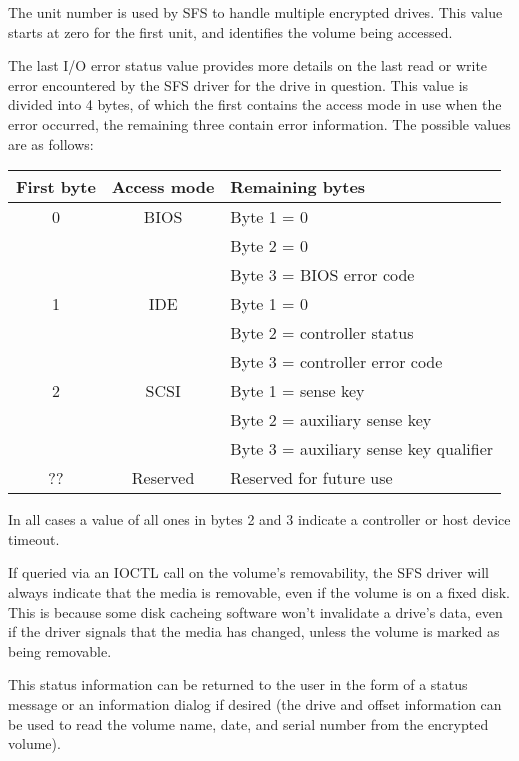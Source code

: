 The unit number is used by SFS to handle multiple encrypted drives.  This value
starts at zero for the first unit, and identifies the volume being accessed.

The last I/O error status value provides more details on the last read or write
error encountered by the SFS driver for the drive in question.  This value is
divided into 4 bytes, of which the first contains the access mode in use when
the error occurred, the remaining three contain error information.  The
possible values are as follows:

\begin{center}
\begin{tabular}{|c|c|l|}
\hline
    First byte & Access mode  &  Remaining bytes\\
\hline
        0      &    BIOS      &   Byte 1 = 0\\
               &              &   Byte 2 = 0\\
               &              &   Byte 3 = BIOS error code\\
        1      &    IDE       &   Byte 1 = 0\\
               &              &   Byte 2 = controller status\\
               &              &   Byte 3 = controller error code\\
        2      &    SCSI      &   Byte 1 = sense key\\
               &              &   Byte 2 = auxiliary sense key\\
               &              &   Byte 3 = auxiliary sense key qualifier\\
       ??      &  Reserved    &   Reserved for future use\\
\hline
\end{tabular}
\end{center}

In all cases a value of all ones in bytes 2 and 3 indicate a controller or host
device timeout.

If queried via an IOCTL call on the volume's removability, the SFS driver will
always indicate that the media is removable, even if the volume is on a fixed
disk.  This is because some disk cacheing software won't invalidate a drive's
data, even if the driver signals that the media has changed, unless the volume
is marked as being removable.

This status information can be returned to the user in the form of a status
message or an information dialog if desired (the drive and offset information 
can be used to read the volume name, date, and serial number from the encrypted 
volume).


